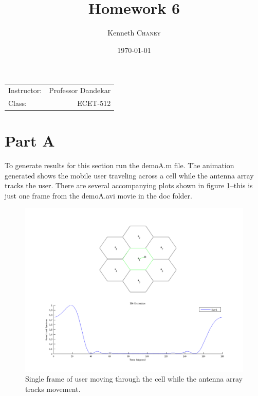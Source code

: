\documentclass{article}
\title{Homework 6} %
\author{Kenneth \textsc{Chaney}} %
\date{\today} %
\begin{document}
\maketitle %

\begin{center}
\begin{tabular}{l r}
Instructor: & Professor Dandekar \\ %
Class: & ECET-512
\end{tabular}
\end{center}



\pagebreak

\section{Part A}\label{partA}

To generate results for this section run the demoA.m file. The animation generated shows the mobile user traveling
across a cell while the antenna array tracks the user. There are several accompanying plots shown in figure
\ref{parta}--this is just one frame from the demoA.avi movie in the doc folder.\\


\begin{figure}[h]
\centerline{\includegraphics[width=5in]{doc/partA.png}}
\caption{Single frame of user moving through the cell while the antenna array tracks movement.}
\label{parta}
\end{figure}
\end{document}
